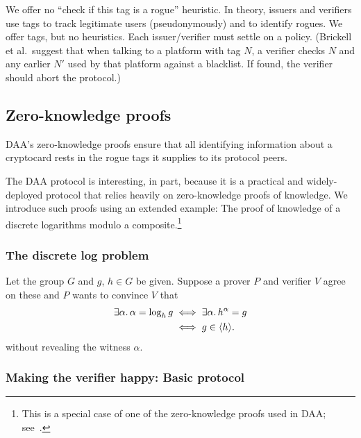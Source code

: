 We offer no “check if this tag is a rogue” heuristic. In
theory, issuers and verifiers use tags to track legitimate
users (pseudonymously) and to identify rogues. We offer tags,
but no heuristics. Each issuer/verifier must settle on a
policy. (Brickell et al.\ suggest that when talking to a
platform with tag $N$, a verifier checks $N$ and any earlier $N'$
used by that platform against a blacklist. If found, the
verifier should abort the protocol.)

\subsection{Zero-knowledge proofs}

\begin{comment}
	\emph{PDS:}
	Security property:  Unforgeability (by reduction to the
	flexible RSA problem).

	Alleged security properties: Satistical witness
	indistinguishable and soundness (by reduction to the flexible
	RSA problem in the random oracle model).
\end{comment}
\fi

DAA's zero-knowledge proofs ensure that all identifying information
about a cryptocard rests in the rogue tags it supplies to its protocol peers.

The DAA protocol is interesting, in part, because it is a practical
and widely-deployed protocol that relies heavily on zero-knowledge
proofs of knowledge.
We introduce such proofs using an extended example: The
proof of knowledge of a discrete logarithms modulo a
composite.\footnote{%
	This is a special case of one of the zero-knowledge proofs used in DAA;
	see~\cite[Appendix~A]{daa:full}.}

\subsubsection{The discrete log problem}

Let the group $G$ and $g$, $h \in G$ be given.
Suppose a prover $P$ and
verifier $V$ agree on these and $P$ wants to convince $V$ that
\begin{align*}
\exists \alpha.\, \alpha = \log_h g &\iff \exists \alpha.\, h^\alpha = g \\
	&\iff g \in \langle{h}\rangle.
\end{align*}
without revealing the witness $\alpha$.

\subsubsection{Making the verifier happy: Basic protocol}


